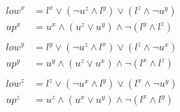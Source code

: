 \begin{align*}
\mathit{low}^x &= l^x \lor (\lnot u^z \land l^y) \lor (l^z \land \lnot u^y) \\
\mathit{up}^x &= u^x \land (u^z \lor u^y) \land \lnot(l^y \land l^z) \\
&\\
\mathit{low}^y &= l^y \lor (\lnot u^z \land l^x) \lor (l^z \land \lnot u^x) \\
\mathit{up}^y &= u^y \land (u^z \lor u^x) \land \lnot(l^x \land l^z) \\
&\\
\mathit{low}^z &= l^z \lor (\lnot u^x \land l^y) \lor (l^x \land \lnot u^y) \\
\mathit{up}^z &= u^z \land (u^x \lor u^y) \land \lnot(l^x \land l^y )
\end{align*}
